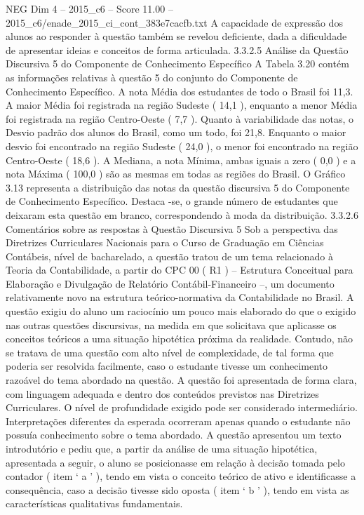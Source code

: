 \begin{textsample}{NEG Dim 4 – 2015\_c6 – Score 11.00 – 2015\_c6/enade\_2015\_ci\_cont\_383e7cacfb.txt}
A capacidade de expressão dos alunos ao responder à questão também se revelou deficiente, dada a dificuldade de apresentar ideias e conceitos de forma articulada. 3.3.2.5 Análise da Questão Discursiva 5 do Componente de Conhecimento Específico A Tabela 3.20 contém as informações relativas à questão 5 do conjunto do Componente de Conhecimento Específico.
A nota Média dos estudantes de todo o Brasil foi 11,3.
A maior Média foi registrada na região Sudeste ( 14,1 ), enquanto a menor Média foi registrada na região Centro-Oeste ( 7,7 ).
Quanto à variabilidade das notas, o Desvio padrão dos alunos do Brasil, como um todo, foi 21,8.
Enquanto o maior desvio foi encontrado na região Sudeste ( 24,0 ), o menor foi encontrado na região Centro-Oeste ( 18,6 ).
A Mediana, a nota Mínima, ambas iguais a zero ( 0,0 ) e a nota Máxima ( 100,0 ) são as mesmas em todas as regiões do Brasil.
O Gráfico 3.13 representa a distribuição das notas da questão discursiva 5 do Componente de Conhecimento Específico.
Destaca -se, o grande número de estudantes que deixaram esta questão em branco, correspondendo à moda da distribuição. 3.3.2.6 Comentários sobre as respostas à Questão Discursiva 5 Sob a perspectiva das Diretrizes Curriculares Nacionais para o Curso de Graduação em Ciências Contábeis, nível de bacharelado, a questão tratou de um tema relacionado à Teoria da Contabilidade, a partir do CPC 00 ( R1 ) – Estrutura Conceitual para Elaboração e Divulgação de Relatório Contábil-Financeiro –, um documento relativamente novo na estrutura teórico-normativa da Contabilidade no Brasil.
A questão exigiu do aluno um raciocínio um pouco mais elaborado do que o exigido nas outras questões discursivas, na medida em que solicitava que aplicasse os conceitos teóricos a uma situação hipotética próxima da realidade.
Contudo, não se tratava de uma questão com alto nível de complexidade, de tal forma que poderia ser resolvida facilmente, caso o estudante tivesse um conhecimento razoável do tema abordado na questão.
A questão foi apresentada de forma clara, com linguagem adequada e dentro dos conteúdos previstos nas Diretrizes Curriculares.
O nível de profundidade exigido pode ser considerado intermediário.
Interpretações diferentes da esperada ocorreram apenas quando o estudante não possuía conhecimento sobre o tema abordado.
A questão apresentou um texto introdutório e pediu que, a partir da análise de uma situação hipotética, apresentada a seguir, o aluno se posicionasse em relação à decisão tomada pelo contador ( item ‘ a ’ ), tendo em vista o conceito teórico de ativo e identificasse a consequência, caso a decisão tivesse sido oposta ( item ‘ b ’ ), tendo em vista as características qualitativas fundamentais.

\end{textsample}
